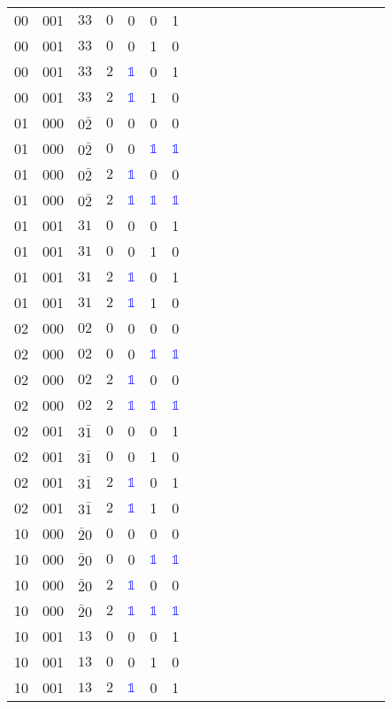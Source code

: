 \begin{longtable*}{c| cccccccccccccccccccc }
00& 001& $33$& $0$& 0& 0& 1\\
00& 001& $33$& $0$& 0& 1& 0\\
00& 001& $33$& $2$& \textcolor{blue}{$\mathds{1}$}& 0& 1\\
00& 001& $33$& $2$& \textcolor{blue}{$\mathds{1}$}& 1& 0\\
01& 000& $0\bar{2}$& $0$& 0& 0& 0\\
01& 000& $0\bar{2}$& $0$& 0& \textcolor{blue}{$\mathds{1}$}& \textcolor{blue}{$\mathds{1}$}\\
01& 000& $0\bar{2}$& $2$& \textcolor{blue}{$\mathds{1}$}& 0& 0\\
01& 000& $0\bar{2}$& $2$& \textcolor{blue}{$\mathds{1}$}& \textcolor{blue}{$\mathds{1}$}& \textcolor{blue}{$\mathds{1}$}\\
01& 001& $31$& $0$& 0& 0& 1\\
01& 001& $31$& $0$& 0& 1& 0\\
01& 001& $31$& $2$& \textcolor{blue}{$\mathds{1}$}& 0& 1\\
01& 001& $31$& $2$& \textcolor{blue}{$\mathds{1}$}& 1& 0\\
02& 000& $02$& $0$& 0& 0& 0\\
02& 000& $02$& $0$& 0& \textcolor{blue}{$\mathds{1}$}& \textcolor{blue}{$\mathds{1}$}\\
02& 000& $02$& $2$& \textcolor{blue}{$\mathds{1}$}& 0& 0\\
02& 000& $02$& $2$& \textcolor{blue}{$\mathds{1}$}& \textcolor{blue}{$\mathds{1}$}& \textcolor{blue}{$\mathds{1}$}\\
02& 001& $3\bar{1}$& $0$& 0& 0& 1\\
02& 001& $3\bar{1}$& $0$& 0& 1& 0\\
02& 001& $3\bar{1}$& $2$& \textcolor{blue}{$\mathds{1}$}& 0& 1\\
02& 001& $3\bar{1}$& $2$& \textcolor{blue}{$\mathds{1}$}& 1& 0\\
10& 000& $\bar{2}0$& $0$& 0& 0& 0\\
10& 000& $\bar{2}0$& $0$& 0& \textcolor{blue}{$\mathds{1}$}& \textcolor{blue}{$\mathds{1}$}\\
10& 000& $\bar{2}0$& $2$& \textcolor{blue}{$\mathds{1}$}& 0& 0\\
10& 000& $\bar{2}0$& $2$& \textcolor{blue}{$\mathds{1}$}& \textcolor{blue}{$\mathds{1}$}& \textcolor{blue}{$\mathds{1}$}\\
10& 001& $13$& $0$& 0& 0& 1\\
10& 001& $13$& $0$& 0& 1& 0\\
10& 001& $13$& $2$& \textcolor{blue}{$\mathds{1}$}& 0& 1\\

\end{longtable*}
